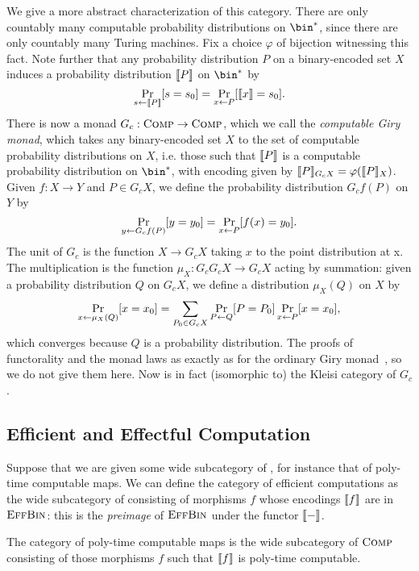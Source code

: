 We give a more abstract characterization of this category. There
are only countably many computable probability distributions on $\bin^*$, since
there are only countably many Turing machines. Fix a choice $\varphi$ of
bijection witnessing this fact. Note further that any probability distribution
$P$ on a binary-encoded set $X$ induces a probability distribution
$\llbracket P \rrbracket$ on $\bin^*$ by \[
  \Pr_{s\leftarrow \llbracket P \rrbracket}[s = s_0] = \Pr_{x\leftarrow P}[\llbracket x \rrbracket = s_0].
\]
There is now a monad $G_c: {\textsc{\text{Comp}}}\to{\textsc{\text{Comp}}}$, which we call the
\emph{computable Giry monad}, which takes any binary-encoded set $X$ to the set
of computable probability distributions on $X$, i.e. those such that
$\llbracket P \rrbracket$ is a computable probability distribution on $\bin^*$, with encoding
given by $\llbracket P \rrbracket_{G_c X} = \varphi(\llbracket P \rrbracket_X)$. Given $f: X\to Y$ and
$P\in G_c X$, we define the probability distribution $G_c f(P)$ on $Y$ by
\[
  \Pr_{y\leftarrow G_c f(P)}[y = y_0] = \Pr_{x\leftarrow P}[f(x) = y_0].
\]
The unit of $G_c$ is the function $X\to G_c X$ taking $x$ to the point
distribution at x. The multiplication is the function $\mu_X: G_c G_c X\to G_c X$
acting by summation: given a probability distribution $Q$ on $G_c X$, we define
a distribution $\mu_X (Q)$ on $X$ by \begin{equation*}\label{eqn:giry-sum}
  \Pr_{x\leftarrow \mu_X(Q)}[x = x_0] = \sum_{P_0\in G_c X} \Pr_{P\leftarrow Q}[P =
  P_0]\Pr_{x\leftarrow P}[x = x_0],
\end{equation*}which converges because $Q$ is a probability distribution. The proofs of
functorality and the monad laws as exactly as for the ordinary Giry
monad~\cite{giry-1982}, so we do not give them here. Now  is in
fact (isomorphic to) the Kleisi category of $G_c$.

\subsection{Efficient and Effectful Computation}

Suppose that we are given some wide subcategory  of ,
for instance that of poly-time computable maps. We can define the category
 of efficient computations as the wide subcategory of 
consisting of morphisms $f$ whose encodings $\llbracket f \rrbracket$ are in ${\textsc{\text{EffBin}}}$:
this is the \emph{preimage} of ${\textsc{\text{EffBin}}}$ under the functor $\llbracket - \rrbracket$.

\begin{dfn}
  The category  of poly-time computable maps is the wide subcategory
  of ${\textsc{\text{Comp}}}$ consisting of those morphisms $f$ such that $\llbracket f \rrbracket$ is
  poly-time computable.
\end{dfn}

